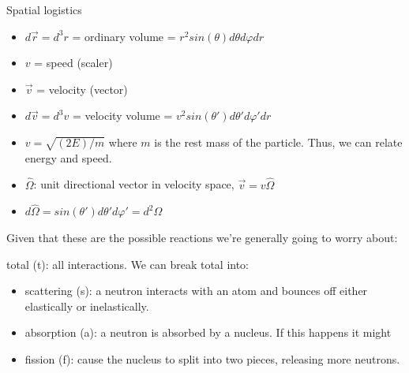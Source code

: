 \documentclass[12pt]{article}
\newcommand{\vOmega}{\ensuremath{\hat{\Omega}}}
\begin{document}
Spatial logistics
\begin{itemize}
\item $d\vec{r} = d^3r$ = ordinary volume = $r^2 sin(\theta) d\theta d\varphi dr$
%
\item $v$ = speed (scaler)
\item $\vec{v}$ = velocity (vector)
\item $d\vec{v} = d^3v$ = velocity volume = $v^2 sin(\theta')d\theta' d\varphi' dr$
\item $v = \sqrt{(2E)/m}$ where $m$ is the rest mass of the particle. Thus, we can relate energy and speed.

\item $\vOmega$: unit directional vector in velocity space, $\vec{v} = v\vOmega$
\item $d\vOmega = sin(\theta')d\theta' d\varphi' =  d^2\Omega$
\end{itemize}

Given that these are the possible reactions we're generally going to worry about:

\hspace*{2em}total (t): all interactions. We can break total into:
\begin{itemize}
\item scattering (s): a neutron interacts with an atom and bounces off either elastically or inelastically.
\item absorption (a): a neutron is absorbed by a nucleus. If this happens it might
\item fission (f): cause the nucleus to split into two pieces, releasing more neutrons.
\end{itemize}
\end{document}

